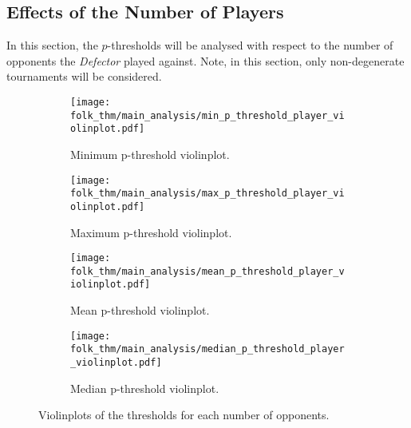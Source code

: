\subsection{Effects of the Number of Players}\label{subsec:Effects_of_the_number_of_Players}
In this section, the \(p\)-thresholds will be analysed with respect to the
number of opponents the \textit{Defector} played against. Note, in this section,
only non-degenerate tournaments will be considered.


\begin{figure}
    \centering
    \begin{subfigure}{0.45\textwidth}
        \centering
        \texttt{[image: folk\_thm/main\_analysis/min\_p\_threshold\_player\_violinplot.pdf]}
        \caption{Minimum p-threshold violinplot.}\label{subfig:min_thresh_player_violinplot}
    \end{subfigure}
    \begin{subfigure}{0.45\textwidth}
        \centering
        \texttt{[image: folk\_thm/main\_analysis/max\_p\_threshold\_player\_violinplot.pdf]}
        \caption{Maximum p-threshold violinplot.}\label{subfig:max_thresh_player_violinplot}
    \end{subfigure}

    \begin{subfigure}{0.45\textwidth}
        \centering
        \texttt{[image: folk\_thm/main\_analysis/mean\_p\_threshold\_player\_violinplot.pdf]}
        \caption{Mean p-threshold violinplot.}\label{subfig:mean_thresh_player_violinplot}        
    \end{subfigure}
    \begin{subfigure}{0.45\textwidth}
        \centering
        \texttt{[image: folk\_thm/main\_analysis/median\_p\_threshold\_player\_violinplot.pdf]}
        \caption{Median p-threshold violinplot.}\label{subfig:median_thresh_player_violinplot}
    \end{subfigure}
    \caption{Violinplots of the thresholds for each number of opponents.}\label{fig:player_mean_thresh_violinplot}
\end{figure}

